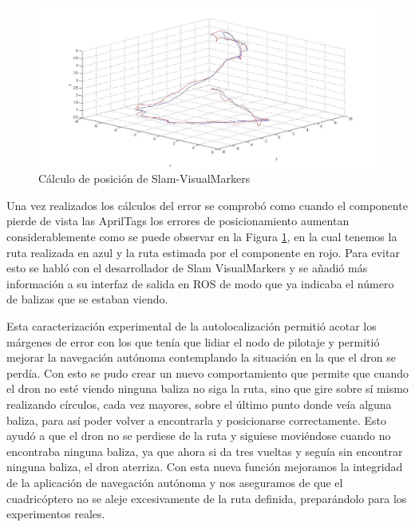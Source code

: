 \begin{figure}[H]
	\begin{center}
		\includegraphics[width=1\textwidth]{imag/IMG48.jpg}
				\caption{Cálculo de posición de Slam-VisualMarkers}
		\label{fig:Comparativa Slam-Visualmarkers.}	
	\end{center}
\end{figure}

\hspace{1cm} Una vez realizados los cálculos del error se comprobó como cuando el componente pierde de vista las AprilTags los errores de posicionamiento aumentan considerablemente como se puede observar en la Figura \ref{fig:Comparativa Slam-Visualmarkers.}, en la cual tenemos la ruta realizada en azul y la ruta estimada por el componente en rojo. Para evitar esto se habló con el desarrollador de Slam VisualMarkers y se añadió más información a su interfaz de salida en ROS de modo que ya indicaba el número de balizas que se estaban viendo.

\hspace{1cm} Esta caracterización experimental de la autolocalización permitió acotar los márgenes de error con los que tenía que lidiar el nodo de pilotaje y permitió mejorar la navegación autónoma contemplando la situación en la que el dron se perdía. Con esto se pudo crear un nuevo comportamiento que permite que cuando el dron no esté viendo ninguna baliza no siga la ruta, sino que gire sobre sí mismo realizando círculos, cada vez mayores, sobre el último punto donde veía alguna baliza, para así poder volver a encontrarla y posicionarse correctamente. Esto ayudó a que el dron no se perdiese de la ruta y siguiese moviéndose cuando no encontraba ninguna baliza, ya que ahora si da tres vueltas y seguía sin encontrar ninguna baliza, el dron aterriza. Con esta nueva función mejoramos la integridad de la aplicación de navegación autónoma y nos aseguramos de que el cuadricóptero no se aleje excesivamente de la ruta definida, preparándolo para los experimentos reales.

